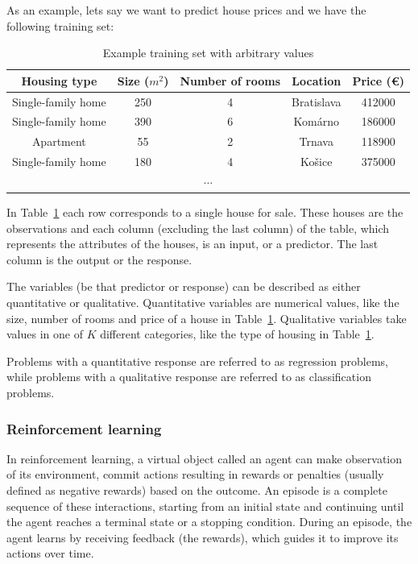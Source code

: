 \documentclass[a4paper,oneside,onecolumn,12pt]{book}
\begin{document}
		As an example, lets say we want to predict house prices and we have the following training set:
		\begin{table}[H]
		\begin{center}
		\begin{tabular}{|c|c|c|c||c|}
			\hline
			\textbf{Housing type} & \textbf{Size ($m^2$)} & \textbf{Number of rooms} & \textbf{Location} & \textbf{Price (€)}\\
			\hline
			Single-family home & 250 & 4 & Bratislava & 412000\\
			\hline
			Single-family home & 390 & 6 & Komárno & 186000\\ 
			\hline
			Apartment & 55 & 2 & Trnava & 118900\\
			\hline
			Single-family home & 180 & 4 & Košice & 375000\\
			\hline
			\multicolumn{5}{|c|}{$\cdots$} \\
			\hline
		\end{tabular}
		\end{center}
		\caption{Example training set with arbitrary values}
		\label{table:example_train_set}
		\end{table}
		In Table~\ref{table:example_train_set} each row corresponds to a single house for sale. These houses are the observations and each column (excluding the last column) of the table, which represents the attributes of the houses, is an input, or a predictor. The last column is the output or the response.

		The variables (be that predictor or response) can be described as either quantitative or qualitative. Quantitative variables are numerical values, like the size, number of rooms and price of a house in Table~\ref{table:example_train_set}. Qualitative variables take values in one of $K$ different categories, like the type of housing in Table~\ref{table:example_train_set}. 
		
		Problems with a quantitative response are referred to as regression problems, while problems with a qualitative response are referred to as classification problems. \cite{AISL}

		\subsubsection{Reinforcement learning}
		In reinforcement learning, a virtual object called an agent can make observation of its environment, commit actions resulting in rewards or penalties (usually defined as negative rewards) based on the outcome. An episode is a complete sequence of these interactions, starting from an initial state and continuing until the agent reaches a terminal state or a stopping condition. During an episode, the agent learns by receiving feedback (the rewards), which guides it to improve its actions over time. \cite{HMLSKT}
\end{document}
